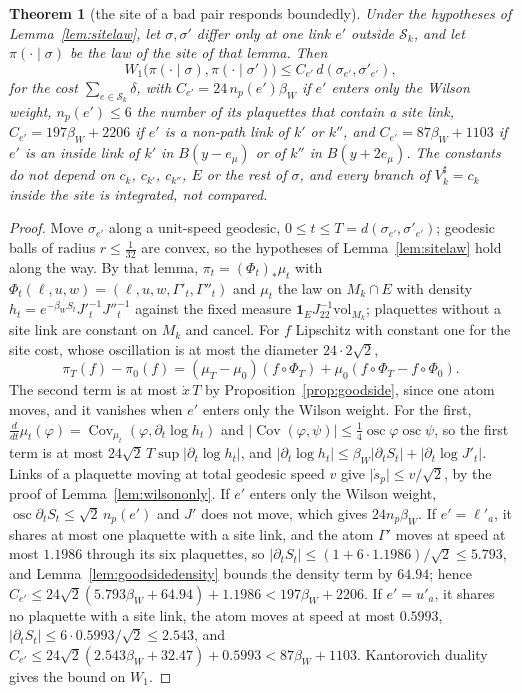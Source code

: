 \documentclass[11pt]{amsart}
\newtheorem{theorem}{Theorem}[section]
\theoremstyle{definition}
\theoremstyle{remark}
\numberwithin{equation}{section}
\newcommand{\Cov}{\operatorname{Cov}}
\begin{document}
\begin{theorem}[the site of a bad pair responds boundedly]\label{thm:site}
Under the hypotheses of Lemma~\ref{lem:sitelaw}, let $\sigma,\sigma'$ differ
only at one link $e'$ outside $\mathcal S_k$, and let $\pi(\cdot\mid\sigma)$
be the law of the site of that lemma. Then
\[
W_1\bigl(\pi(\cdot\mid\sigma),\pi(\cdot\mid\sigma')\bigr)\le C_{e'}\,
d(\sigma_{e'},\sigma'_{e'}),
\]
for the cost $\sum_{e\in\mathcal S_k}\delta$, with $C_{e'}=24\,n_p(e')
\beta_W$ if $e'$ enters only the Wilson weight, $n_p(e')\le6$ the number of
its plaquettes that contain a site link, $C_{e'}=197\beta_W+2206$ if $e'$
is a non-path link of $k'$ or $k''$, and $C_{e'}=87\beta_W+1103$ if $e'$
is an inside link of $k'$ in $B(y-e_\mu)$ or of $k''$ in $B(y+2e_\mu)$. The
constants do not depend on $c_k$, $c_{k'}$, $c_{k''}$, $E$ or the rest of
$\sigma$, and every branch of $V^\sharp_k=c_k$ inside the site is
integrated, not compared.
\end{theorem}

\begin{proof}
Move $\sigma_{e'}$ along a unit-speed geodesic, $0\le t\le T=d(\sigma_{e'},
\sigma'_{e'})$; geodesic balls of radius $r\le\frac1{32}$ are convex, so
the hypotheses of Lemma~\ref{lem:sitelaw} hold along the way. By that
lemma, $\pi_t=(\Phi_t)_*\mu_t$ with
$\Phi_t(\ell,u,w)=(\ell,u,w,\Gamma'_t,\Gamma''_t)$ and $\mu_t$ the law on
$M_k\cap E$ with density $h_t=e^{-\beta_WS_t}J'^{-1}_tJ''^{-1}_t$ against
the fixed measure $\mathbf 1_EJ_{22}^{-1}\mathrm{vol}_{M_k}$; plaquettes
without a site link are constant on $M_k$ and cancel. For $f$ Lipschitz
with constant one for the site cost, whose oscillation is at most the
diameter $24\cdot2\sqrt2$,
\[
\pi_T(f)-\pi_0(f)=(\mu_T-\mu_0)(f\circ\Phi_T)+\mu_0(f\circ\Phi_T-f\circ
\Phi_0).
\]
The second term is at most $\dot x\,T$ by Proposition~\ref{prop:goodside},
since one atom moves, and it vanishes when $e'$ enters only the Wilson
weight. For the first, $\frac d{dt}\mu_t(\varphi)=\Cov_{\mu_t}(\varphi,
\partial_t\log h_t)$ and $\lvert\Cov(\varphi,\psi)\rvert\le\frac14
\operatorname{osc}\varphi\operatorname{osc}\psi$, so the first term is at
most $24\sqrt2\,T\sup\lvert\partial_t\log h_t\rvert$, and
$\lvert\partial_t\log h_t\rvert\le\beta_W\lvert\partial_tS_t\rvert+
\lvert\partial_t\log J'_t\rvert$. Links of a plaquette moving at total
geodesic speed $v$ give $\lvert\dot s_p\rvert\le v/\sqrt2$, by the proof of
Lemma~\ref{lem:wilsononly}. If $e'$ enters only the Wilson weight,
$\operatorname{osc}\partial_tS_t\le\sqrt2\,n_p(e')$ and $J'$ does not move,
which gives $24n_p\beta_W$. If $e'=\ell'_a$, it shares at most one
plaquette with a site link, and the atom $\Gamma'$ moves at speed at most
$1.1986$ through its six plaquettes, so $\lvert\partial_tS_t\rvert\le(1+6
\cdot1.1986)/\sqrt2\le5.793$, and Lemma~\ref{lem:goodsidedensity} bounds the
density term by $64.94$; hence $C_{e'}\le24\sqrt2(5.793\beta_W+64.94)+
1.1986<197\beta_W+2206$. If $e'=u'_a$, it shares no plaquette with a site
link, the atom moves at speed at most $0.5993$, $\lvert\partial_tS_t\rvert
\le6\cdot0.5993/\sqrt2\le2.543$, and $C_{e'}\le24\sqrt2(2.543\beta_W+32.47)
+0.5993<87\beta_W+1103$. Kantorovich duality gives the bound on $W_1$.
\end{proof}
\end{document}
